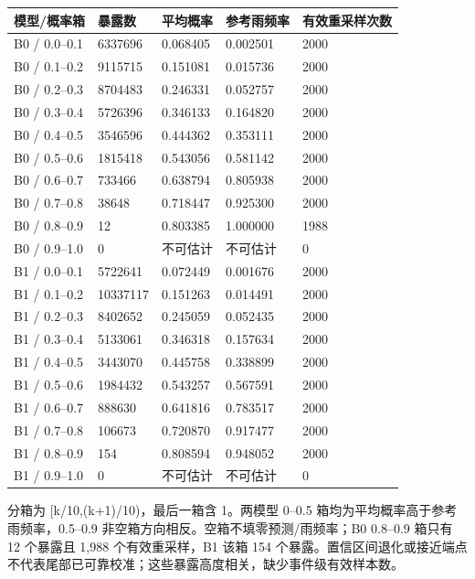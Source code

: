 \documentclass[UTF8,a4paper,10pt,fontset=fandol]{ctexart}
\begin{document}
\begin{center}\scriptsize\begin{longtable}{@{}p{}p{}p{}p{}p{}@{}}\toprule
模型/概率箱 & 暴露数 & 平均概率 & 参考雨频率 & 有效重采样次数\\
\midrule\endhead
B0 / 0.0–0.1 & 6337696 & 0.068405 & 0.002501 & 2000\\
B0 / 0.1–0.2 & 9115715 & 0.151081 & 0.015736 & 2000\\
B0 / 0.2–0.3 & 8704483 & 0.246331 & 0.052757 & 2000\\
B0 / 0.3–0.4 & 5726396 & 0.346133 & 0.164820 & 2000\\
B0 / 0.4–0.5 & 3546596 & 0.444362 & 0.353111 & 2000\\
B0 / 0.5–0.6 & 1815418 & 0.543056 & 0.581142 & 2000\\
B0 / 0.6–0.7 & 733466 & 0.638794 & 0.805938 & 2000\\
B0 / 0.7–0.8 & 38648 & 0.718447 & 0.925300 & 2000\\
B0 / 0.8–0.9 & 12 & 0.803385 & 1.000000 & 1988\\
B0 / 0.9–1.0 & 0 & 不可估计 & 不可估计 & 0\\
B1 / 0.0–0.1 & 5722641 & 0.072449 & 0.001676 & 2000\\
B1 / 0.1–0.2 & 10337117 & 0.151263 & 0.014491 & 2000\\
B1 / 0.2–0.3 & 8402652 & 0.245059 & 0.052435 & 2000\\
B1 / 0.3–0.4 & 5133061 & 0.346318 & 0.157634 & 2000\\
B1 / 0.4–0.5 & 3443070 & 0.445758 & 0.338899 & 2000\\
B1 / 0.5–0.6 & 1984432 & 0.543257 & 0.567591 & 2000\\
B1 / 0.6–0.7 & 888630 & 0.641816 & 0.783517 & 2000\\
B1 / 0.7–0.8 & 106673 & 0.720870 & 0.917477 & 2000\\
B1 / 0.8–0.9 & 154 & 0.808594 & 0.948052 & 2000\\
B1 / 0.9–1.0 & 0 & 不可估计 & 不可估计 & 0\\
\bottomrule\end{longtable}\end{center}\normalsize

分箱为 [k/10,(k+1)/10)，最后一箱含 1。两模型 0–0.5 箱均为平均概率高于参考雨频率，0.5–0.9 非空箱方向相反。空箱不填零预测/雨频率；B0 0.8–0.9 箱只有 12 个暴露且 1,988 个有效重采样，B1 该箱 154 个暴露。置信区间退化或接近端点不代表尾部已可靠校准；这些暴露高度相关，缺少事件级有效样本数。\par
\end{document}
